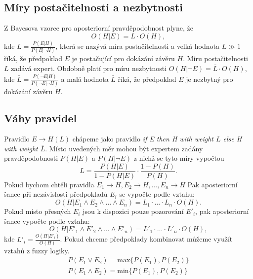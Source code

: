 \documentclass[12pt]{article}
\begin{document}
\subsection{Míry postačitelnosti a nezbytnosti}
Z Bayesova vzorce pro aposteriorní pravděpodobnost plyne, že
\begin{equation}
O(H|E)=L\cdot O(H),
\end{equation}
kde $L=\frac{P(E|H)}{P(E|\lnot H)}$, která se nazývá míra postačitelnosti a velká hodnota $L\gg1$ říká, že předpoklad $E$ je postačující pro dokázání závěru $H$. Míru postačitelnosti $L$ zadává expert. Obdobně platí pro míru nezbytnosti $O(H|\lnot E)=\bar{L}\cdot O(H)$, kde $\bar{L}=\frac{P(\lnot E|H)}{P(\lnot E|\lnot H)}$ a malá hodnota $\bar{L}$ říká, že předpoklad $E$ je nezbytný pro dokázání závěru $H$.

\subsection{Váhy pravidel}
Pravidlo $E\rightarrow H(L)$ chápeme jako pravidlo \textit{if E then H with weight $L$ else H with weight $\bar{L}$}. Místo uvedených měr mohou být expertem zadány pravděpodobnosti $P(H|E)$ a $P(H|\lnot E)$ z nichž se tyto míry vypočtou
\begin{equation}
L=\frac{P(H|E)}{1-P(H|E)}\cdot \frac{1-P(H)}{P(H)}.
\end{equation}
Pokud bychom chtěli pravidla $E_1 \rightarrow H, E_2 \rightarrow H, \ldots, E_n \rightarrow H$ Pak aposteriorní šance při nezávislosti předpokladů $E_i$ se vypočte podle vztahu:
\begin{equation}
O(H|E_1 \wedge E_2 \wedge \ldots \wedge E_n)=L_1\cdot \ldots \cdot L_n \cdot O(H).
\end{equation}
Pokud místo přesných $E_i$ jsou k dispozici pouze pozorování $E'_i$, pak aposteriorní šance vypočte podle vztahu:
\begin{equation}
O(H|E'_1 \wedge E'_2 \wedge \ldots \wedge E'_n)=L'_1\cdot \ldots \cdot L'_n \cdot O(H),
\end{equation}
kde $L'_i=\frac{O(H|E'_i)}{O(H)}$. Pokud chceme předpoklady kombinovat můžeme využít vztahů z fuzzy logiky.
\begin{equation}
\begin{aligned}
P(E_1 \lor E_2) = \text{max}\{P(E_1), P(E_2)\}\\
P(E_1 \wedge E_2) = \text{min}\{P(E_1), P(E_2)\}
\end{aligned}
\end{equation}
\end{document}

